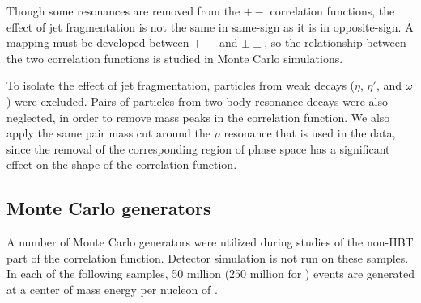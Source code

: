 Though some resonances are removed from the $+-$ correlation functions, the effect of jet fragmentation is not the same in same-sign as it is in opposite-sign.
A mapping must be developed between $+-$ and $\pm\pm$, so the relationship between the two correlation functions is studied in Monte Carlo simulations.

To isolate the effect of jet fragmentation, particles from weak decays ($\eta$, $\eta'$, and $\omega$) were excluded.
Pairs of particles from two-body resonance decays were also neglected, in order to remove mass peaks in the correlation function.
We also apply the same pair mass cut around the $\rho$ resonance that is used in the data, since the removal of the corresponding region of phase space has a significant effect on the shape of the correlation function.

\subsection{Monte Carlo generators}
\label{subsec:generators}

A number of Monte Carlo generators were utilized during studies of the non-HBT part of the correlation function.
Detector simulation is not run on these samples.
In each of the following samples, 50 million (250 million for \PYEight) \minbias events are generated at a center of mass energy per nucleon of \pPbenergy.

